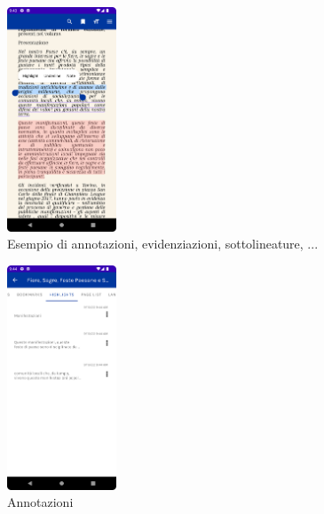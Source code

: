 \begin{multicols}{3}
            \begin{figure}[H]
                \centering
                \includegraphics[width=0.29\textwidth]{img/annotations.png}
                \caption{Esempio di annotazioni, evidenziazioni, sottolineature, ...}
                \label{annotations-android}
            \end{figure}
            
            \begin{figure}[H]
                \centering
                \includegraphics[width=0.29\textwidth]{img/annotation2.png}
                \caption{Annotazioni}
                \label{annotation2-android}
            \end{figure}


\end{multicols}
